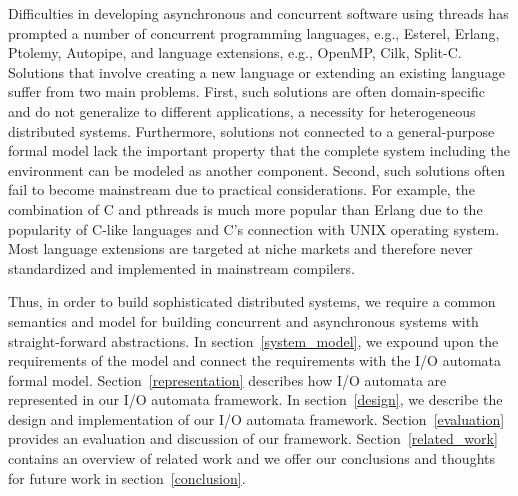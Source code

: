\documentclass[letterpaper]{article}
\begin{document}
Difficulties in developing asynchronous and concurrent software using threads has prompted a number of concurrent programming languages, e.g., Esterel, Erlang, Ptolemy, Autopipe, and language extensions, e.g., OpenMP, Cilk, Split-C.
Solutions that involve creating a new language or extending an existing language suffer from two main problems.
First, such solutions are often domain-specific and do not generalize to different applications, a necessity for heterogeneous distributed systems.
Furthermore, solutions not connected to a general-purpose formal model lack the important property that the complete system including the environment can be modeled as another component.
Second, such solutions often fail to become mainstream due to practical considerations.
For example, the combination of C and pthreads is much more popular than Erlang due to the popularity of C-like languages and C's connection with UNIX operating system.
Most language extensions are targeted at niche markets and therefore never standardized and implemented in mainstream compilers.

Thus, in order to build sophisticated distributed systems, we require a common semantics and model for building concurrent and asynchronous systems with straight-forward abstractions.
In section~\ref{system_model}, we expound upon the requirements of the model and connect the requirements with the I/O automata formal model.
Section~\ref{representation} describes how I/O automata are represented in our I/O automata framework.
In section~\ref{design}, we describe the design and implementation of our I/O automata framework.
Section~\ref{evaluation} provides an evaluation and discussion of our framework.
Section~\ref{related_work} contains an overview of related work and we offer our conclusions and thoughts for future work in section~\ref{conclusion}.


\end{document}
